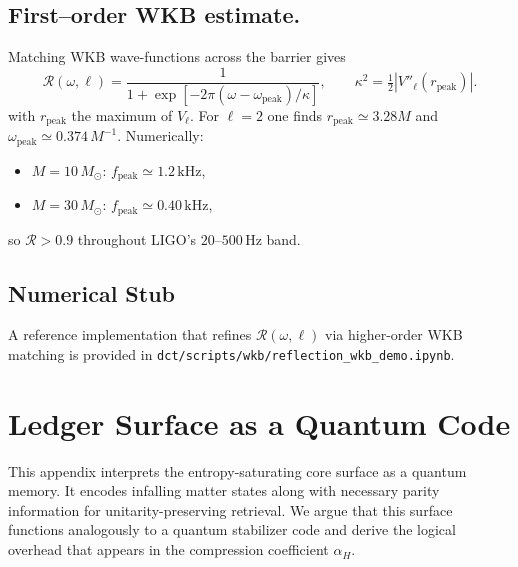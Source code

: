 \documentclass[a4paper, 12pt, oneside]{book}
\numberwithin{equation}{chapter}
\begin{document}
\section{First–order WKB estimate.}
Matching WKB wave-functions across the barrier gives
\[
    \boxed{
      \mathcal R(\omega,\ell)
      = \frac{1}{1+\exp[-2\pi(\omega-\omega_{\text{peak}})/\kappa]},
      \qquad
      \kappa^{2} = \tfrac12\!\left|V''_\ell(r_{\text{peak}})\right|
    }.
\]
with \(r_{\text{peak}}\) the maximum of \(V_\ell\).
For \(\ell=2\) one finds \(r_{\text{peak}}\simeq3.28M\) and
\(\omega_{\text{peak}}\simeq0.374\,M^{-1}\).
Numerically:

\begin{itemize}
  \item \(M=10\,M_\odot\): \(f_{\text{peak}}\simeq1.2\,\mathrm{kHz}\),
  \item \(M=30\,M_\odot\): \(f_{\text{peak}}\simeq0.40\,\mathrm{kHz}\),
\end{itemize}
so \(\mathcal R>0.9\) throughout LIGO’s \(20\)–\(500\,\mathrm{Hz}\) band.
\medskip

\section{Numerical Stub}
A reference implementation that refines \(\mathcal R(\omega,\ell)\)
via higher-order WKB matching is provided in
\verb|dct/scripts/wkb/reflection_wkb_demo.ipynb|.




\chapter{Ledger Surface as a Quantum Code}
\label{app:QuantumLedger}

\noindent
This appendix interprets the entropy-saturating core surface as a quantum memory.  
It encodes infalling matter states along with necessary parity information for unitarity-preserving retrieval.  
We argue that this surface functions analogously to a quantum stabilizer code and derive the logical overhead  
that appears in the compression coefficient \( \alpha_H \).
\end{document}
